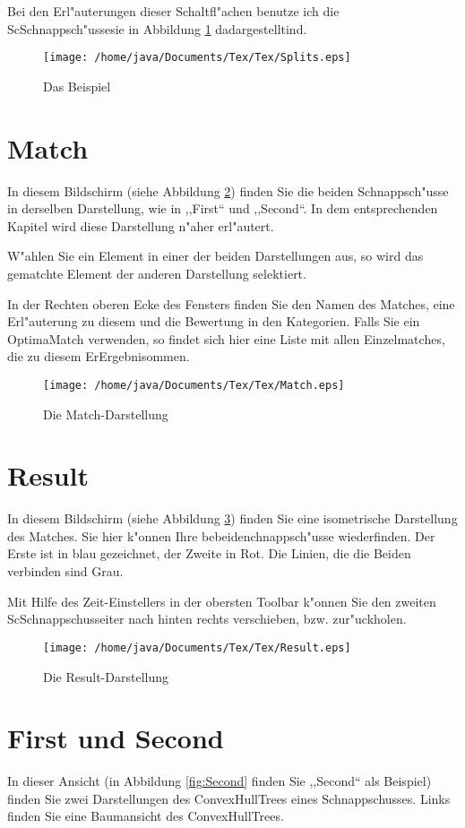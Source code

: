 \documentclass[a4paper,10pt,twoside]{scrreprt}
\begin{document}
Bei den Erl"auterungen dieser Schaltfl"achen benutze ich die ScSchnappsch"ussesie in Abbildung \ref{fig:Splits} dadargestelltind.
\begin{figure}
   \centering
   \texttt{[image: /home/java/Documents/Tex/Tex/Splits.eps]}
   \caption{Das Beispiel}
   \label{fig:Splits}
\end{figure}
\section{Match}
In diesem Bildschirm (siehe Abbildung \ref{fig:Match}) finden Sie die beiden Schnappsch"usse in derselben Darstellung, wie in ,,First`` und ,,Second``. In dem entsprechenden Kapitel wird diese Darstellung n"aher erl"autert. 

W"ahlen Sie ein Element in einer der beiden Darstellungen aus, so wird das gematchte Element der anderen Darstellung selektiert. 

In der Rechten oberen Ecke des Fensters finden Sie den Namen des Matches, eine Erl"auterung zu diesem und die Bewertung in den Kategorien. Falls Sie ein OptimaMatch verwenden, so findet sich hier eine Liste mit allen Einzelmatches, die zu diesem ErErgebnisommen.
\begin{figure}
   \centering
   \texttt{[image: /home/java/Documents/Tex/Tex/Match.eps]}
   \caption{Die Match-Darstellung}
   \label{fig:Match}
\end{figure}

\section{Result}
In diesem Bildschirm (siehe Abbildung \ref{fig:Result}) finden Sie eine isometrische Darstellung des Matches. Sie hier k"onnen Ihre bebeidenchnappsch"usse wiederfinden. Der Erste ist in blau gezeichnet, der Zweite in Rot. Die Linien, die die Beiden verbinden sind Grau. 

Mit Hilfe des Zeit-Einstellers in der obersten Toolbar k"onnen Sie den zweiten ScSchnappschusseiter nach hinten rechts verschieben, bzw. zur"uckholen. 

\begin{figure}
   \centering
   \texttt{[image: /home/java/Documents/Tex/Tex/Result.eps]}
   \caption{Die Result-Darstellung}
   \label{fig:Result}
\end{figure}
\section{First und Second}
In dieser Ansicht (in Abbildung \ref{fig:Second} finden Sie ,,Second`` als Beispiel) finden Sie zwei Darstellungen des ConvexHullTrees eines Schnappschusses. Links finden Sie eine Baumansicht des ConvexHullTrees.
\end{document}
